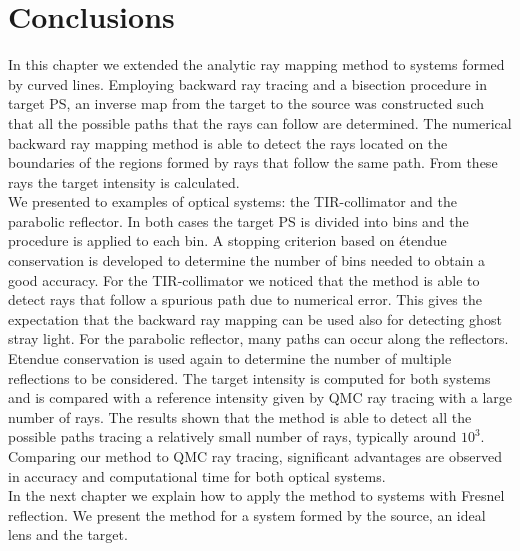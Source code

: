 \section{Conclusions}
In this chapter we extended the analytic ray mapping method to systems formed by curved lines. Employing backward ray tracing and a bisection procedure in target PS, an inverse map from the target to the source was constructed such that all the possible paths that the rays can follow are determined. The numerical backward ray mapping method is able to detect the rays located on the boundaries of the regions formed by rays that follow the same path. From these rays the target intensity is calculated. 
\\ \indent
We presented to examples of optical systems: the TIR-collimator and the parabolic reflector. In both cases the target PS is divided into bins and the procedure is applied to each bin. A stopping criterion based on \'{e}tendue conservation is developed to determine the number of bins needed to obtain a good accuracy. For the TIR-collimator we noticed that the method is able to detect rays that follow a spurious path due to numerical error. This gives the expectation that the backward ray mapping can be used also for detecting ghost stray light.
For the parabolic reflector, many paths can occur along the reflectors. Etendue conservation is used again to determine the number of multiple reflections to be considered. The target intensity is computed for both systems and is compared with a reference intensity given by QMC ray tracing with a large number of rays. The results shown that the method is able to detect all the possible paths tracing a relatively small number of rays, typically around $10^3$. Comparing our method to QMC ray tracing, significant advantages are observed in accuracy and computational time for both optical systems.
\\ \indent In the next chapter we explain how to apply the method to systems with Fresnel reflection. We present the method for a system formed by the source, an ideal lens and the target. 













